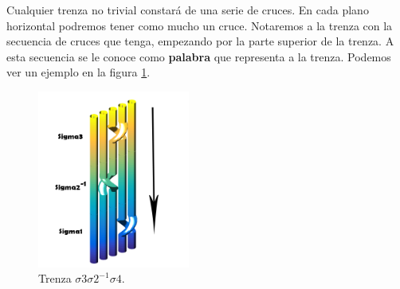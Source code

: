 Cualquier trenza no trivial constará de una serie de cruces. En cada plano horizontal podremos tener como mucho un cruce. Notaremos a la trenza con la secuencia de cruces que tenga, empezando por la parte superior de la trenza. A esta secuencia se le conoce como \textbf{palabra} que representa a la trenza. Podemos ver un ejemplo en la figura \ref{tren5}.\\
\begin{figure}[h!]
	\centering
	\includegraphics[width=5cm]{itrenzas/t7.png}
	\caption{Trenza $\sigma3\sigma2^{-1}\sigma4$.}
	\label{tren5} 
\end{figure}


